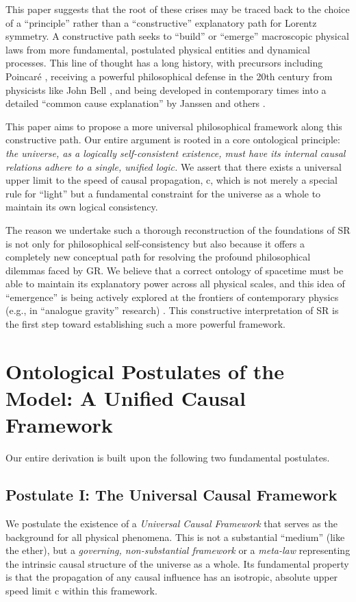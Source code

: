 \documentclass[11pt, a4paper]{article}
\begin{document}
This paper suggests that the root of these crises may be traced back to the choice of a ``principle'' rather than a ``constructive'' explanatory path for Lorentz symmetry. A constructive path seeks to ``build'' or ``emerge'' macroscopic physical laws from more fundamental, postulated physical entities and dynamical processes. This line of thought has a long history, with precursors including Poincaré \cite{Poincare1905}, receiving a powerful philosophical defense in the 20th century from physicists like John Bell \cite{Bell1976}, and being developed in contemporary times into a detailed ``common cause explanation'' by Janssen and others \cite{Janssen2002}.

This paper aims to propose a more universal philosophical framework along this constructive path. Our entire argument is rooted in a core ontological principle: \textit{the universe, as a logically self-consistent existence, must have its internal causal relations adhere to a single, unified logic.} We assert that there exists a universal upper limit to the speed of causal propagation, c, which is not merely a special rule for ``light'' but a fundamental constraint for the universe as a whole to maintain its own logical consistency.

The reason we undertake such a thorough reconstruction of the foundations of SR is not only for philosophical self-consistency but also because it offers a completely new conceptual path for resolving the profound philosophical dilemmas faced by GR. We believe that a correct ontology of spacetime must be able to maintain its explanatory power across all physical scales, and this idea of ``emergence'' is being actively explored at the frontiers of contemporary physics (e.g., in ``analogue gravity'' research) \cite{Barcelo2005}. This constructive interpretation of SR is the first step toward establishing such a more powerful framework.

\section{Ontological Postulates of the Model: A Unified Causal Framework}

Our entire derivation is built upon the following two fundamental postulates.

\subsection{Postulate I: The Universal Causal Framework}
We postulate the existence of a \textit{Universal Causal Framework} that serves as the background for all physical phenomena. This is not a substantial ``medium'' (like the ether), but a \textit{governing, non-substantial framework} or a \textit{meta-law} representing the intrinsic causal structure of the universe as a whole. Its fundamental property is that the propagation of any causal influence has an isotropic, absolute upper speed limit c within this framework.
\end{document}
